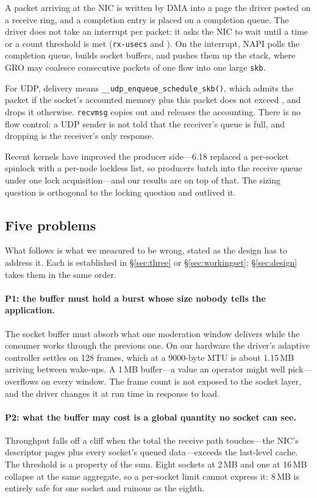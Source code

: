 A packet arriving at the NIC is written by DMA into a page the driver posted on
a receive ring, and a completion entry is placed on a completion queue. The
driver does not take an interrupt per packet: it asks the NIC to wait until a
time or a count threshold is met (\texttt{rx-usecs} and \rxframes). On the
interrupt, NAPI polls the completion queue, builds socket buffers, and pushes
them up the stack, where GRO may coalesce consecutive packets of one flow into
one large \texttt{skb}.

For UDP, delivery means \texttt{\_\_udp\_enqueue\_schedule\_skb()}, which admits
the packet if the socket's accounted memory plus this packet does not exceed
\rcvbuf, and drops it otherwise. \texttt{recvmsg} copies out and releases the
accounting. There is no flow control: a UDP sender is not told that the
receiver's queue is full, and dropping is the receiver's only response.

Recent kernels have improved the producer side---6.18 replaced a per-socket
spinlock with a per-node lockless list, so producers batch into the receive
queue under one lock acquisition---and our results are on top of that. The
sizing question is orthogonal to the locking question and outlived it.

\subsection{Five problems}
\label{sec:problems}

What follows is what we measured to be wrong, stated as the design has to
address it. Each is established in \S\ref{sec:three} or \S\ref{sec:workingset};
\S\ref{sec:design} takes them in the same order.

\paragraph{P1: the buffer must hold a burst whose size nobody tells the
application.} The socket buffer must absorb what one moderation window delivers
while the consumer works through the previous one. On our hardware the driver's
adaptive controller settles on 128 frames, which at a 9000-byte MTU is about
1.15\,MB arriving between wake-ups. A 1\,MB buffer---a value an operator might
well pick---overflows on every window. The frame count is not exposed to the
socket layer, and the driver changes it at run time in response to load.

\paragraph{P2: what the buffer may cost is a global quantity no socket can
see.} Throughput falls off a cliff when the total the receive path touches---the
NIC's descriptor pages plus every socket's queued data---exceeds the last-level
cache. The threshold is a property of the sum. Eight sockets at 2\,MB and one at
16\,MB collapse at the same aggregate, so a per-socket limit cannot express it:
8\,MB is entirely safe for one socket and ruinous as the eighth.

